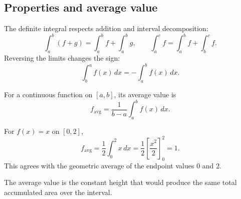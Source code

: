 \subsection{Properties and average value}

The definite integral respects addition and interval decomposition:
\[
\int_a^b (f+g)=\int_a^b f+\int_a^b g,
\qquad
\int_a^c f=\int_a^b f+\int_b^c f.
\]
Reversing the limits changes the sign:
\[
\int_b^a f(x)\,dx=-\int_a^b f(x)\,dx.
\]

\begin{definitionbox}
For a continuous function on \([a,b]\), its average value is
\[
f_{\mathrm{avg}}=\frac{1}{b-a}\int_a^b f(x)\,dx.
\]
\end{definitionbox}

\begin{examplebox}
For \(f(x)=x\) on \([0,2]\),
\[
f_{\mathrm{avg}}=\frac12\int_0^2 x\,dx
=\frac12\left[\frac{x^2}{2}\right]_0^2=1.
\]
This agrees with the geometric average of the endpoint values \(0\) and \(2\).
\end{examplebox}

\begin{interpretationbox}
The average value is the constant height that would produce the same total accumulated area over the interval.
\end{interpretationbox}
